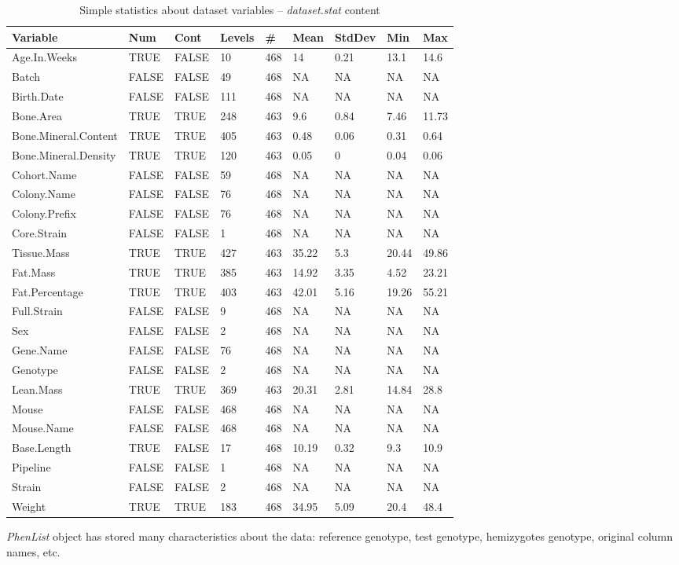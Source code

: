\documentclass[12pt,a4paper]{article}
\begin{document}
\begin{table}[!h]
\begin{center}
\begin{tabular}{|l|l| l | l | l | l | l | l | l |}
  \hline
Variable&Num&Cont&Levels&\#&Mean&StdDev&Min&Max\\\hline
Age.In.Weeks&TRUE&FALSE&10&468&14&0.21&13.1&14.6\\
Batch&FALSE&FALSE&49&468&NA&NA&NA&NA\\
Birth.Date&FALSE&FALSE&111&468&NA&NA&NA&NA\\
Bone.Area&TRUE&TRUE&248&463&9.6&0.84&7.46&11.73\\
Bone.Mineral.Content&TRUE&TRUE&405&463&0.48&0.06&0.31&0.64\\
Bone.Mineral.Density&TRUE&TRUE&120&463&0.05&0&0.04&0.06\\
Cohort.Name&FALSE&FALSE&59&468&NA&NA&NA&NA\\
Colony.Name&FALSE&FALSE&76&468&NA&NA&NA&NA\\
Colony.Prefix&FALSE&FALSE&76&468&NA&NA&NA&NA\\
Core.Strain&FALSE&FALSE&1&468&NA&NA&NA&NA\\
Tissue.Mass&TRUE&TRUE&427&463&35.22&5.3&20.44&49.86\\
Fat.Mass&TRUE&TRUE&385&463&14.92&3.35&4.52&23.21\\
Fat.Percentage&TRUE&TRUE&403&463&42.01&5.16&19.26&55.21\\
Full.Strain&FALSE&FALSE&9&468&NA&NA&NA&NA\\
Sex&FALSE&FALSE&2&468&NA&NA&NA&NA\\
Gene.Name&FALSE&FALSE&76&468&NA&NA&NA&NA\\
Genotype&FALSE&FALSE&2&468&NA&NA&NA&NA\\
Lean.Mass&TRUE&TRUE&369&463&20.31&2.81&14.84&28.8\\
Mouse&FALSE&FALSE&468&468&NA&NA&NA&NA\\
Mouse.Name&FALSE&FALSE&468&468&NA&NA&NA&NA\\
Base.Length&TRUE&FALSE&17&468&10.19&0.32&9.3&10.9\\
Pipeline&FALSE&FALSE&1&468&NA&NA&NA&NA\\
Strain&FALSE&FALSE&2&468&NA&NA&NA&NA\\
Weight&TRUE&TRUE&183&468&34.95&5.09&20.4&48.4\\
\hline  
\end{tabular}
\caption{Simple statistics about dataset variables -- \textit{dataset.stat} content}\label{table:05}
\end{center}
\end{table}
\textit{PhenList} object has stored many characteristics about the data: reference genotype, test genotype, hemizygotes genotype, original column names, etc.
\end{document}
